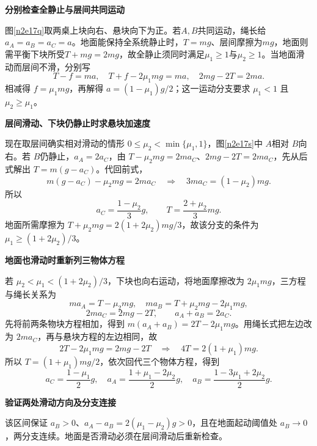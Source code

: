 \begin{solution}\textbf{分别检查全静止与层间共同运动}\par\nobreak
图\ref{n2e17q}取两桌上块向右、悬块向下为正。若$A,B$共同运动，绳长给$a_A=a_B=a_C=a$。地面能保持全系统静止时，$T=mg$、层间摩擦为$mg$，地面则需平衡下块所受$T+mg=2mg$，故全静止须同时满足$\mu_1\ge1$与$\mu_2\ge1$。当地面滑动而层间不滑，分别写
\[
 T-f=ma,\quad T+f-2\mu_1mg=ma,\quad 2mg-2T=2ma.
\]
相减得 $f=\mu_1mg$，再解得 $a=(1-\mu_1)g/2$；这一运动分支要求 $\mu_1<1$ 且 $\mu_2\ge\mu_1$。



\par\medskip{}\noindent\textbf{层间滑动、下块仍静止时求悬块加速度}\par\nobreak
现在取层间确实相对滑动的情形 $0\le\mu_2<\min\{\mu_1,1\}$，图\ref{n2e17s}中 $A$相对 $B$向右。若 $B$仍静止，$a_A=2a_C$，由 $T-\mu_2mg=2ma_C$、$2mg-2T=2ma_C$，先从后式解出 $T=m(g-a_C)$。代回前式，
\[
 m(g-a_C)-\mu_2mg=2ma_C
 \quad\Longrightarrow\quad 3ma_C=(1-\mu_2)mg.
\]
所以
\[
 a_C=\frac{1-\mu_2}{3}g,\qquad T=\frac{2+\mu_2}{3}mg.
\]
地面所需摩擦为 $T+\mu_2mg=2(1+2\mu_2)mg/3$，故该分支的条件为 $\mu_1\ge(1+2\mu_2)/3$。



\par\medskip{}\noindent\textbf{地面也滑动时重新列三物体方程}\par\nobreak
若 $\mu_2<\mu_1<(1+2\mu_2)/3$，下块也向右运动，将地面摩擦改为 $2\mu_1mg$，三方程与绳长关系为
\[
 ma_A=T-\mu_2mg,\quad ma_B=T+\mu_2mg-2\mu_1mg,
\]
\[
 2ma_C=2mg-2T,\qquad a_A+a_B=2a_C.
\]
先将前两条物块方程相加，得到 $m(a_A+a_B)=2T-2\mu_1mg$。用绳长式把左边改为 $2ma_C$，再与悬块方程的左边相同，故
\[
 2T-2\mu_1mg=2mg-2T
 \quad\Longrightarrow\quad 4T=2(1+\mu_1)mg.
\]
所以 $T=(1+\mu_1)mg/2$，依次回代三个物体方程，得到
\[
 a_C=\frac{1-\mu_1}{2}g,\quad
 a_A=\frac{1+\mu_1-2\mu_2}{2}g,\quad
 a_B=\frac{1-3\mu_1+2\mu_2}{2}g.
\]


\par\medskip{}\noindent\textbf{验证两处滑动方向及分支连接}\par\nobreak
该区间保证 $a_B>0$、$a_A-a_B=2(\mu_1-\mu_2)g>0$，且在地面起动阈值处 $a_B\to0$，两分支连续。地面是否滑动必须在层间滑动后重新检查。
\end{solution}

